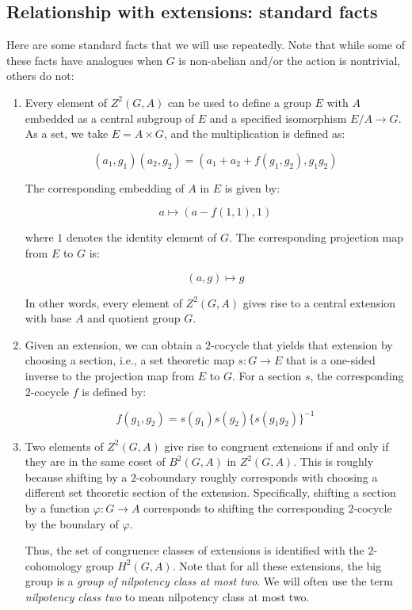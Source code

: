 \documentclass[10pt]{amsart}
\begin{document}
\subsection{Relationship with extensions: standard facts}

Here are some standard facts that we will use repeatedly. Note that
while some of these facts have analogues when $G$ is non-abelian
and/or the action is nontrivial, others do not:

\begin{enumerate}
\item Every element of $Z^2(G,A)$ can be used to define a group $E$
  with $A$ embedded as a central subgroup of $E$ and a specified
  isomorphism $E/A \to G$. As a set, we take $E = A \times G$, and the
  multiplication is defined as:

  $$(a_1,g_1)(a_2,g_2) = (a_1 + a_2 + f(g_1,g_2), g_1g_2)$$

  The corresponding embedding of $A$ in $E$ is given by:

  $$a \mapsto (a - f(1,1), 1)$$

  where $1$ denotes the identity element of $G$. The corresponding
  projection map from $E$ to $G$ is:

  $$(a,g) \mapsto g$$

  In other words, every element of $Z^2(G,A)$ gives rise to a central
  extension with base $A$ and quotient group $G$.
\item Given an extension, we can obtain a $2$-cocycle that yields that
  extension by choosing a section, i.e., a set theoretic map $s:G \to
  E$ that is a one-sided inverse to the projection map from $E$ to
  $G$. For a section $s$, the corresponding $2$-cocycle $f$ is defined
  by:

  $$f(g_1,g_2) = s(g_1)s(g_2)\{s(g_1g_2)\}^{-1}$$

\item Two elements of $Z^2(G,A)$ give rise to congruent extensions if
  and only if they are in the same coset of $B^2(G,A)$ in
  $Z^2(G,A)$. This is roughly because shifting by a $2$-coboundary
  roughly corresponds with choosing a different set theoretic section
  of the extension. Specifically, shifting a section by a function
  $\varphi:G \to A$ corresponds to shifting the corresponding
  $2$-cocycle by the boundary of $\varphi$.

  Thus, the set of congruence classes of extensions is identified with
  the $2$-cohomology group $H^2(G,A)$. Note that for all these
  extensions, the big group is a {\em group of nilpotency class at
  most two}. We will often use the term {\em nilpotency class two} to
  mean nilpotency class at most two.


\end{enumerate}
\end{document}
